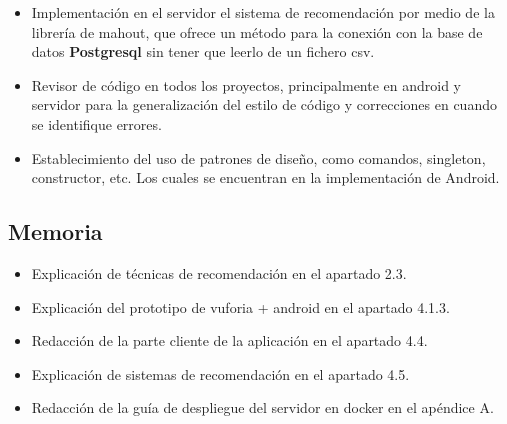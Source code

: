 \begin{itemize}
            \item Implementación en el servidor el sistema de recomendación por medio de la 
            librería de mahout, que ofrece un método para la conexión con la base de datos 
            \textbf{Postgresql} sin tener que leerlo de un fichero csv.
            \item Revisor de código en todos los proyectos, principalmente en android y servidor para la generalización del estilo de código y correcciones 
            en cuando se identifique errores.
            \item Establecimiento del uso de patrones de diseño, como comandos, singleton, 
            constructor, etc. Los cuales se encuentran en la implementación de Android. 
        \end{itemize}
    \subsection{Memoria}
    \label{makereference7.4.3}
        \begin{itemize}
            \item Explicación de técnicas de recomendación en el apartado 2.3.
            \item Explicación del prototipo de vuforia + android en el apartado 4.1.3.
            \item Redacción de la parte cliente de la aplicación en el apartado 4.4.
            \item Explicación de sistemas de recomendación en el apartado 4.5.
            \item Redacción de la guía de despliegue del servidor en docker en el apéndice A.
        \end{itemize}
